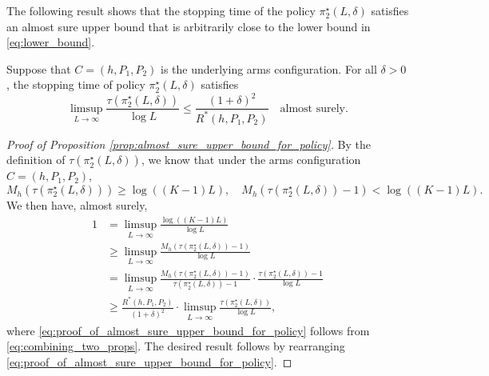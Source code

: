 The following result shows that the stopping time of the policy $\pi_2^\star(L, \delta)$ satisfies an almost sure upper bound that is arbitrarily close to the lower bound in \eqref{eq:lower_bound}.
\begin{prop}
	\label{prop:almost_sure_upper_bound_for_policy}
	Suppose that $C=(h, P_1, P_2)$ is the underlying arms configuration. For all $\delta>0$, the stopping time of policy $\pi_2^\star(L,\delta)$ satisfies 
	\begin{equation}
		\limsup\limits_{L\to\infty} \frac{\tau(\pi_2^\star(L,\delta))}{\log L} \leq \frac{(1+\delta)^2}{R^*(h, P_1, P_2)}\quad \text{almost surely.}
		\label{eq:almost_sure_upper_bound_for_policy}
	\end{equation}
\end{prop}
\begin{proof}[Proof of Proposition \ref{prop:almost_sure_upper_bound_for_policy}]
	By the definition of $\tau(\pi_2^\star(L,\delta))$, we know that under the arms configuration $C=(h, P_1, P_2)$, $$M_h(\tau(\pi_2^\star(L,\delta)))\geq \log ((K-1)L), \quad M_h(\tau(\pi_2^\star(L,\delta))-1) < \log ((K-1)L).$$ We then have, almost surely,
	\begin{align}
		1 &= \limsup\limits_{L \to \infty} \frac{\log ((K-1)L)}{\log L}\nonumber\\
		& \geq \limsup\limits_{L \to \infty} \frac{M_{h}(\tau(\pi_2^\star(L,\delta))-1)}{\log L}\nonumber\\
		& = \limsup\limits_{L \to \infty} \frac{M_{h}(\tau(\pi_2^\star(L,\delta))-1)}{\tau(\pi_2^\star(L,\delta))-1} \cdot \frac{\tau(\pi_2^\star(L,\delta))-1}{\log L} \nonumber\\
		& \geq \frac{R^*(h, P_1, P_2)}{(1+\delta)^2}\cdot \limsup\limits_{L \to \infty}  \frac{\tau(\pi_2^\star(L,\delta))}{\log L},
	\label{eq:proof_of_almost_sure_upper_bound_for_policy}
	\end{align}
where \eqref{eq:proof_of_almost_sure_upper_bound_for_policy} follows from \eqref{eq:combining_two_props}. The desired result follows by rearranging \eqref{eq:proof_of_almost_sure_upper_bound_for_policy}. 
\end{proof}

